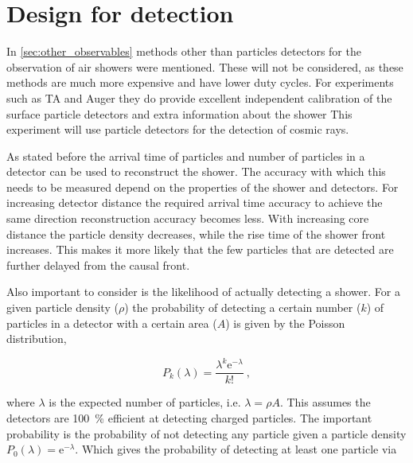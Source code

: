 \section{Design for detection}

In \cref{sec:other_observables} methods other than particles detectors for the observation of air showers were mentioned. These will not be considered, as these methods are much more expensive and have lower duty cycles. For experiments such as TA and Auger they do provide excellent independent calibration of the surface particle detectors and extra information about the shower This experiment will use particle detectors for the detection of cosmic rays.

As stated before the arrival time of particles and number of particles in a detector can be used to reconstruct the shower. The accuracy with which this needs to be measured depend on the properties of the shower and detectors. For increasing detector distance the required arrival time accuracy to achieve the same direction reconstruction accuracy becomes less. With increasing core distance the particle density decreases, while the rise time of the shower front increases. This makes it more likely that the few particles that are detected are further delayed from the causal front.

Also important to consider is the likelihood of actually detecting a shower. For a given particle density ($\rho$) the probability of detecting a certain number ($k$) of particles in a detector with a certain area ($A$) is given by the Poisson distribution,

\begin{equation}
    P_k(\lambda) = \frac{\lambda^k \mathrm{e}^{-\lambda}}{k!} \ ,
\end{equation}

where $\lambda$ is the expected number of particles, i.e. $\lambda = \rho A$. This assumes the detectors are \SI{100}{\percent} efficient at detecting charged particles. The important probability is the probability of not detecting any particle given a particle density $P_0(\lambda) = \mathrm{e}^{-\lambda}$. Which gives the probability of detecting at least one particle via

